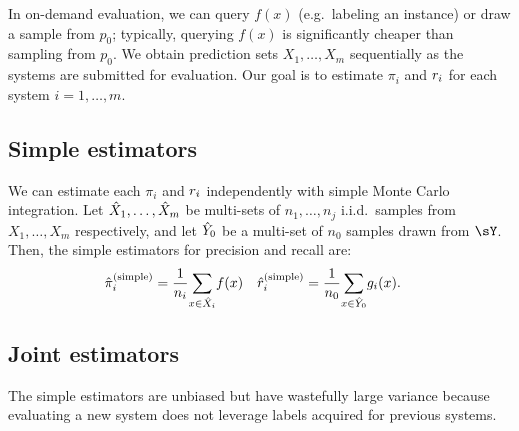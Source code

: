 In on-demand evaluation, we can query $f(x)$ (e.g.\, labeling an instance) or draw a sample from $p_0$;
typically, querying $f(x)$ is significantly cheaper than sampling from $p_0$.
We obtain prediction sets $X_1, \ldots, X_m$ sequentially as the systems are submitted for evaluation.
Our goal is to estimate $\pi_i$ and $r_i$ for each system $i = 1, \dots, m$.

\subsection{Simple estimators}
We can estimate each $\pi_i$ and $r_i$ independently with simple Monte Carlo integration. %
Let ${\hat{X}}_1, \ldots, {\hat{X}}_m$ be multi-sets of $n_1, \ldots, n_j$ i.i.d.~samples from $X_1, \ldots, X_m$ respectively, and let ${\hat{Y}}_0$ be a multi-set of $n_0$ samples drawn from $\sY$.
Then, the simple estimators for precision and recall are:
\begin{align*}
  {\hat{\pi}}_i^{\text{(simple)}} &= \frac1{n_i}\! \sum_{x \in {\hat{X}}_i}\! f(x) & {\hat{r}}_i^{\text{(simple)}} &= \frac1{n_0}\! \sum_{x \in {\hat{Y}}_0}\! g_i(x).
\end{align*}

\subsection{Joint estimators}
\label{sec:kbpo:joint}
The simple estimators are unbiased but have wastefully large variance
because evaluating a new system does not leverage labels acquired for previous
systems.  %

